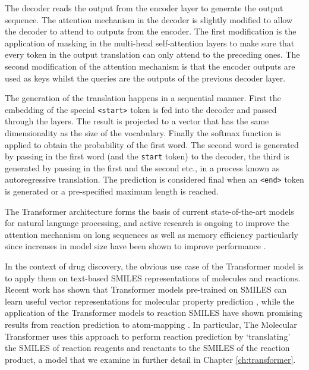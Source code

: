 The decoder reads the output from the encoder layer to generate the output sequence. The attention mechanism in the decoder is slightly modified to allow the decoder to attend to outputs from the encoder. The first modification is the application of masking in the multi-head self-attention layers to make sure that every token in the output translation can only attend to the preceding ones. The second modification of the attention mechanism is that the encoder outputs are used as keys whilst the queries are the outputs of the previous decoder layer. 

The generation of the translation happens in a sequential manner. First the embedding of the special \texttt{<start>} token is fed into the decoder and passed through the layers. The result is projected to a vector that has the same dimensionality as the size of the vocabulary. Finally the softmax function is applied to obtain the probability of the first word. The second word is generated by passing in the first word (and the \texttt{start} token) to the decoder, the third is generated by passing in the first and the second etc., in a process known as autoregressive translation. The prediction is considered final when an \texttt{<end>} token is generated or a pre-specified maximum length is reached.

The Transformer architecture forms the basis of current state-of-the-art models for natural language processing, and active research is ongoing to improve the attention mechanism on long sequences \cite{choromanski2022rethinking} as well as memory efficiency \cite{child2019generating} particularly since increases in model size have been shown to improve performance \cite{kaplan2020scaling}.

In the context of drug discovery, the obvious use case of the Transformer model is to apply them on text-based SMILES representations of molecules and reactions. Recent work has shown that Transformer models pre-trained on SMILES can learn useful vector representations for molecular property prediction \cite{chithrananda2020chemberta}, while the application of the Transformer models to reaction SMILES have shown promising results from reaction prediction \cite{Schwaller2019MolecularPrediction} to atom-mapping \cite{Schwaller2021rxnmapper}. In particular, The Molecular Transformer \cite{Schwaller2019MolecularPrediction} uses this approach to perform reaction prediction by `translating' the SMILES of reaction reagents and reactants to the SMILES of the reaction product, a model that we examine in further detail in Chapter \ref{ch:transformer}.

